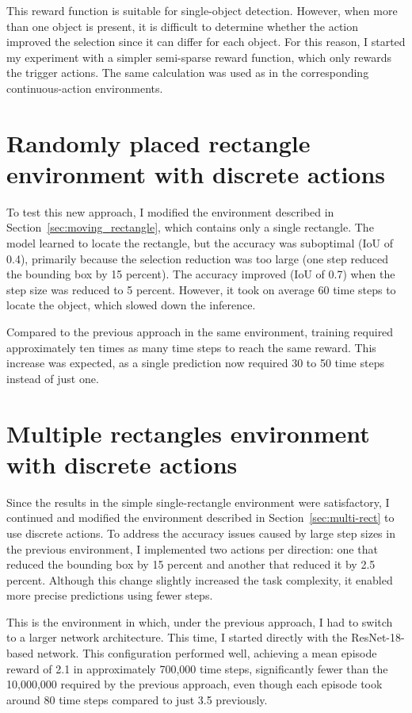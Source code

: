 \documentclass[
  digital,     %
  oneside,     %
  nosansbold,  %
  nocolorbold, %
  lof,         %
  lot,         %
]{fithesis4}
\begin{document}
This reward function is suitable for single-object detection. However, when more than one object is present, it is difficult to determine whether the action improved the selection since it can differ for each object. For this reason, I started my experiment with a simpler semi-sparse reward function, which only rewards the trigger actions. The same calculation was used as in the corresponding continuous-action environments.

\section{Randomly placed rectangle environment with discrete actions}

To test this new approach, I modified the environment described in Section~\ref{sec:moving_rectangle}, which contains only a single rectangle. The model learned to locate the rectangle, but the accuracy was suboptimal (IoU of 0.4), primarily because the selection reduction was too large (one step reduced the bounding box by 15 percent). The accuracy improved (IoU of 0.7) when the step size was reduced to 5 percent. However, it took on average 60 time steps to locate the object, which slowed down the inference.

Compared to the previous approach in the same environment, training required approximately ten times as many time steps to reach the same reward. This increase was expected, as a single prediction now required 30 to 50 time steps instead of just one.

\section{Multiple rectangles environment with discrete actions}

Since the results in the simple single-rectangle environment were satisfactory, I continued and modified the environment described in Section~\ref{sec:multi-rect} to use discrete actions. To address the accuracy issues caused by large step sizes in the previous environment, I implemented two actions per direction: one that reduced the bounding box by 15 percent and another that reduced it by 2.5 percent. Although this change slightly increased the task complexity, it enabled more precise predictions using fewer steps.

This is the environment in which, under the previous approach, I had to switch to a larger network architecture. This time, I started directly with the ResNet-18-based network. This configuration performed well, achieving a mean episode reward of 2.1 in approximately 700,000 time steps, significantly fewer than the 10,000,000 required by the previous approach, even though each episode took around 80 time steps compared to just 3.5 previously.
\end{document}
